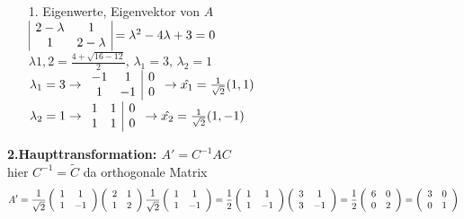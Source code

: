 \documentclass{article}
\begin{document}
\begin{itemize}
    \item[1.] Eigenwerte, Eigenvektor von $A$\\$\begin{array}{|c c|}
        2-\lambda & 1\\
        1 & 2-\lambda
    \end{array} = \lambda^2-4\lambda+3=0$\\$\lambda{1,2}=\frac{4+\sqrt{16-12}}{2},\, \lambda_1 = 3,\, \lambda_2 = 1$\\ $\lambda_1 = 3 \rightarrow \begin{array}{c c| c}
        -1&1&0\\
        1&-1&0\\
    \end{array} \rightarrow \hat{x_1} = \frac{1}{\sqrt{2}} (1,1)$\\
    $\lambda_2 = 1 \rightarrow \begin{array}{c c| c}
        1&1&0\\
        1&1&0\\
    \end{array} \rightarrow \hat{x_2} = \frac{1}{\sqrt{2}} (1,-1)$
\end{itemize}
\textbf{2.Haupttransformation: $A'=C^{-1}AC$}\\
hier $C^{-1}=\tilde{C}$ da orthogonale Matrix
\begin{eqnarray*}
    A' = \frac{1}{\sqrt{2}}\left(\begin{array}{c c}
        1&1\\1&-1
    \end{array}\right)\left(\begin{array}{c c}
        2&1\\1&2
    \end{array}\right)\frac{1}{\sqrt{2}}\left(\begin{array}{c c}
        1&1\\1&-1
    \end{array}\right) = \frac{1}{2}\left(\begin{array}{c c}
        1&1\\1&-1
    \end{array}\right)\left(\begin{array}{c c}
        3&1\\3&-1
    \end{array}\right)=\frac{1}{2}\left(\begin{array}{c c}
        6&0\\0&2
    \end{array}\right) = \left(\begin{array}{c c}
        3&0\\0&1
    \end{array}\right)
\end{eqnarray*}
\end{document}
